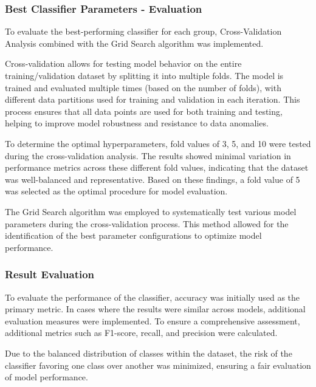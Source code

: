 \documentclass{article}
\begin{document}
\vspace{1cm}

\subsubsection{Best Classifier Parameters - Evaluation}


\hspace{1cm}To evaluate the best-performing classifier for each group, Cross-Validation Analysis combined with the Grid Search algorithm was implemented.

Cross-validation allows for testing model behavior on the entire training/validation dataset by splitting it into multiple folds. The model is trained and evaluated multiple times (based on the number of folds), with different data partitions used for training and validation in each iteration. This process ensures that all data points are used for both training and testing, helping to improve model robustness and resistance to data anomalies.

\hspace{1cm}To determine the optimal hyperparameters, fold values of 3, 5, and 10 were tested during the cross-validation analysis. The results showed minimal variation in performance metrics across these different fold values, indicating that the dataset was well-balanced and representative. Based on these findings, a fold value of 5 was selected as the optimal procedure for model evaluation.

The Grid Search algorithm was employed to systematically test various model parameters during the cross-validation process. This method allowed for the identification of the best parameter configurations to optimize model performance.

\newpage

\subsubsection{Result Evaluation}
\hspace{1cm}To evaluate the performance of the classifier, accuracy was initially used as the primary metric. In cases where the results were similar across models, additional evaluation measures were implemented. To ensure a comprehensive assessment, additional metrics such as F1-score, recall, and precision were calculated.

Due to the balanced distribution of classes within the dataset, the risk of the classifier favoring one class over another was minimized, ensuring a fair evaluation of model performance.
\end{document}
